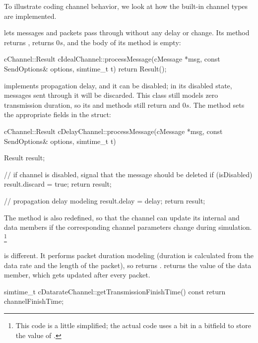 To illustrate coding channel behavior, we look at how the built-in channel
types are implemented.

 lets messages and packets pass through without
any delay or change. Its  method returns
,  returns $0s$, and the
body of its  method is empty:

\begin{cpp}
cChannel::Result cIdealChannel::processMessage(cMessage *msg,
                    const SendOptions& options, simtime_t t)
{
    return Result();
}
\end{cpp}

 implements propagation delay, and it can be
disabled; in its disabled state, messages sent through it will be discarded.
This class still models zero transmission duration, so its
 and 
methods still return  and $0s$. The  method
sets the appropriate fields in the  struct:


\begin{cpp}
cChannel::Result cDelayChannel::processMessage(cMessage *msg,
                    const SendOptions& options, simtime_t t)
{
    Result result;

    // if channel is disabled, signal that the message should be deleted
    if (isDisabled) {
        result.discard = true;
        return result;
    }

    // propagation delay modeling
    result.delay = delay;
    return result;
}
\end{cpp}

The  method is also redefined, so that
the channel can update its internal  and 
data members if the corresponding channel parameters change during simulation.
\footnote{This code is a little simplified; the actual code uses a bit
in a bitfield to store the value of .}

 is different. It performs packet duration modeling
(duration is calculated from the data rate and the length of the packet),
so  returns .
 returns the value of the
 data member, which gets updated after every packet.

\begin{cpp}
simtime_t cDatarateChannel::getTransmissionFinishTime() const
{
    return channelFinishTime;
}
\end{cpp}

